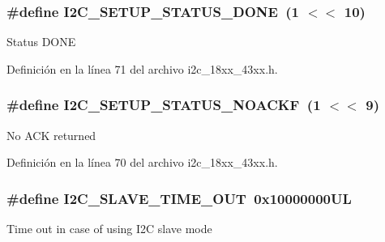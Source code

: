 \subsubsection[{\texorpdfstring{I2\+C\+\_\+\+S\+E\+T\+U\+P\+\_\+\+S\+T\+A\+T\+U\+S\+\_\+\+D\+O\+NE}{I2C_SETUP_STATUS_DONE}}]{\setlength{\rightskip}{0pt plus 5cm}\#define I2\+C\+\_\+\+S\+E\+T\+U\+P\+\_\+\+S\+T\+A\+T\+U\+S\+\_\+\+D\+O\+NE~(1 $<$$<$ 10)}\hypertarget{group___i2_c__18_x_x__43_x_x_gaefbb25ca99e199765e7dcdd6ef343590}{}\label{group___i2_c__18_x_x__43_x_x_gaefbb25ca99e199765e7dcdd6ef343590}
Status D\+O\+NE 

Definición en la línea 71 del archivo i2c\+\_\+18xx\+\_\+43xx.\+h.

\subsubsection[{\texorpdfstring{I2\+C\+\_\+\+S\+E\+T\+U\+P\+\_\+\+S\+T\+A\+T\+U\+S\+\_\+\+N\+O\+A\+C\+KF}{I2C_SETUP_STATUS_NOACKF}}]{\setlength{\rightskip}{0pt plus 5cm}\#define I2\+C\+\_\+\+S\+E\+T\+U\+P\+\_\+\+S\+T\+A\+T\+U\+S\+\_\+\+N\+O\+A\+C\+KF~(1 $<$$<$ 9)}\hypertarget{group___i2_c__18_x_x__43_x_x_ga90a37b470118d82b9682cfc2e0b4de84}{}\label{group___i2_c__18_x_x__43_x_x_ga90a37b470118d82b9682cfc2e0b4de84}
No A\+CK returned 

Definición en la línea 70 del archivo i2c\+\_\+18xx\+\_\+43xx.\+h.

\subsubsection[{\texorpdfstring{I2\+C\+\_\+\+S\+L\+A\+V\+E\+\_\+\+T\+I\+M\+E\+\_\+\+O\+UT}{I2C_SLAVE_TIME_OUT}}]{\setlength{\rightskip}{0pt plus 5cm}\#define I2\+C\+\_\+\+S\+L\+A\+V\+E\+\_\+\+T\+I\+M\+E\+\_\+\+O\+UT~0x10000000\+UL}\hypertarget{group___i2_c__18_x_x__43_x_x_ga33116b352c72ef28879812c66387f17a}{}\label{group___i2_c__18_x_x__43_x_x_ga33116b352c72ef28879812c66387f17a}
Time out in case of using I2C slave mode 

